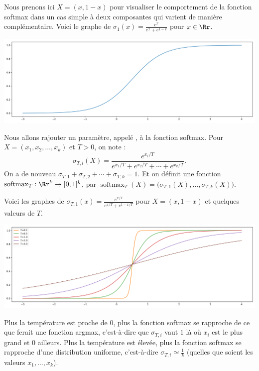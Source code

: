 \documentclass[11pt,class=report,crop=false]{standalone}
\begin{document}
Nous prenons ici \(X = (x, 1 - x)\) pour visualiser le comportement de la fonction softmax dans un cas simple à deux composantes qui varient de manière complémentaire.
Voici le graphe de $\sigma_1(x) = \frac{e^x}{e^x+e^{1-x}}$ pour $x \in \Rr$.
\begin{center}
	\includegraphics[scale=\myscale,scale=0.4]{figures/softmax-01}
\end{center}

\bigskip

Nous allons rajouter un paramètre, appelé , à la fonction softmax.
Pour $X = (x_1,x_2,\ldots,x_k)$ et $T > 0$, on note :
$$\sigma_{T,i}(X)  = \frac{e^{x_i/T}}{ e^{x_1/T} + e^{x_2/T} + \cdots + e^{x_k/T} }.$$
On a de nouveau $\sigma_{T,1} + \sigma_{T,2} + \cdots + \sigma_{T,k} = 1$.
Et on définit une fonction
$\operatorname{softmax}_T : \Rr^k \to [0,1]^k$, par 
$\operatorname{softmax}_T(X) = \big(\sigma_{T,1}(X), \dots, \sigma_{T,k}(X)\big)$.


Voici les graphes de $\sigma_{T,1}(x) = \frac{e^{x/T}}{e^{x/T}+e^{{1-x}/T}}$ pour $X = (x,1-x)$ et quelques valeurs de $T$.

\begin{center}
	\includegraphics[scale=\myscale,scale=0.4]{figures/softmax-02}
\end{center}

Plus la température est proche de $0$, plus la fonction softmax se rapproche de ce que ferait une fonction argmax, c'est-à-dire que $\sigma_{T,i}$ vaut $1$ là où $x_i$ est le plus grand et $0$ ailleurs.
Plus la température est élevée, plus la fonction softmax se rapproche d'une distribution uniforme, c'est-à-dire $\sigma_{T,i} \simeq \frac 1k$ (quelles que soient les valeurs $x_1,\ldots,x_k$).
\end{document}

